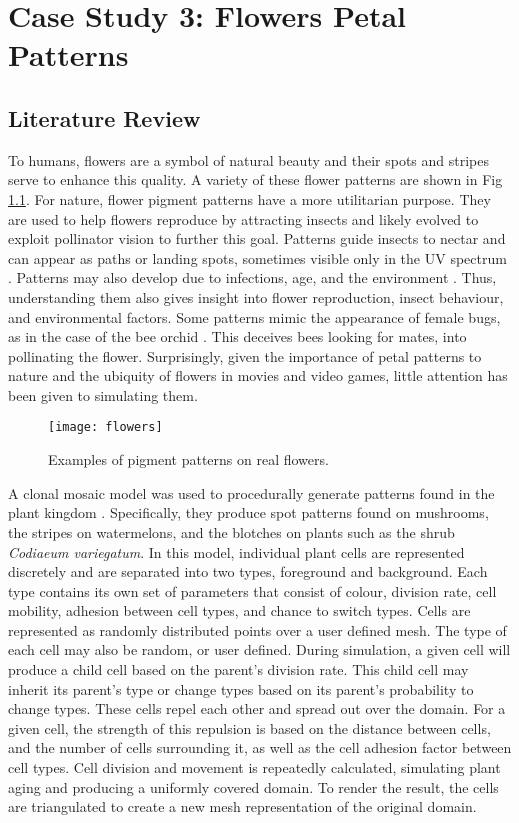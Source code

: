 \chapter{Case Study 3: Flowers Petal Patterns}

\section{Literature Review}
To humans, flowers are a symbol of natural beauty and their spots and stripes serve to enhance this quality. A variety of these flower patterns are shown in Fig \ref{fig:realFlowers}. For nature, flower pigment patterns have a more  utilitarian purpose. They are used to help flowers reproduce by attracting insects and likely evolved to exploit pollinator vision to further this goal. Patterns guide insects to nectar and can appear as paths or landing spots, sometimes visible only in the UV spectrum \citep{Davies2012}. Patterns may also develop due to infections, age, and the environment \citep{Davies2012, ROBINSON2015}. Thus, understanding them also gives insight into flower reproduction, insect behaviour, and environmental factors. Some patterns mimic the appearance of female bugs, as in the case of the bee orchid \citep{Vereecken7484}. This deceives bees looking for mates, into pollinating the flower. Surprisingly, given the importance of petal patterns to nature and the ubiquity of flowers in movies and video games, little attention has been given to simulating them. 

\begin{figure}[!ht]
	\centering
	\texttt{[image: flowers]}
	\caption{Examples of pigment patterns on real flowers.}
	\label{fig:realFlowers}
\end{figure}
A clonal mosaic model was used to procedurally generate patterns found in the plant kingdom \citep{binsfeld2011}. Specifically, they produce spot patterns found on mushrooms, the stripes on watermelons, and the blotches on plants such as the shrub \textit{Codiaeum variegatum}. In this model, individual plant cells are represented discretely and are separated into two types, foreground and background. Each type contains its own set of parameters that consist of colour, division rate, cell mobility, adhesion between cell types, and chance to switch types. Cells are represented as randomly distributed points over a user defined mesh. The type of each cell may also be random, or user defined. During simulation, a given cell will produce a child cell based on the parent's division rate. This child cell may inherit its parent's type or change types based on its parent's probability to change types. These cells repel each other and spread out over the domain. For a given cell, the strength of this repulsion is based on the distance between cells, and the number of cells surrounding it, as well as the cell adhesion factor between cell types. Cell division and movement is repeatedly calculated, simulating plant aging and producing a uniformly covered domain. To render the result, the cells are triangulated to create a new mesh representation of the original domain. 


